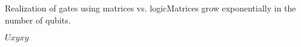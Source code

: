 {\begin{frame}{Realization of gates using matrices vs. logic}{Matrices grow exponentially in the number of qubits.}
{\begin{center}
\begin{UTable}{$U$}{\alert<7>{$x$}}{$y$}{}{\alert<7>{$x$}}{$y$}
\end{UTable}\end{center}
\begin{center}
\begin{GateBox}[scale=1.0]{2}{1}{2}
\end{GateBox}
\end{center}
    }
\end{frame}
}